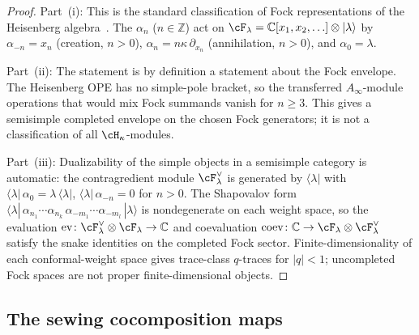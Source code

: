 \begin{proof}
Part~(i): This is the standard classification of Fock representations of
the Heisenberg algebra~\cite{FBZ04}. The $\alpha_n$ ($n \in \mathbb{Z}$)
act on $\cF_\lambda = \mathbb{C}[x_1, x_2, \ldots] \otimes
|\lambda\rangle$ by $\alpha_{-n} = x_n$ (creation, $n > 0$),
$\alpha_n = n\kappa\,\partial_{x_n}$ (annihilation, $n > 0$), and
$\alpha_0 = \lambda$.

Part~(ii): The statement is by definition a statement about the Fock
envelope. The Heisenberg OPE has no simple-pole bracket, so the
transferred $A_\infty$-module operations that would mix Fock summands
vanish for $n\ge3$. This gives a semisimple completed envelope on the
chosen Fock generators; it is not a classification of all
$\cH_\kappa$-modules.

Part~(iii): Dualizability of the simple objects in a semisimple
category is automatic: the contragredient module $\cF_\lambda^\vee$
is generated by $\langle\lambda|$ with $\langle\lambda|\,\alpha_0
= \lambda\,\langle\lambda|$, $\langle\lambda|\,\alpha_{-n} = 0$
for $n > 0$. The Shapovalov form
$\langle\lambda|\,\alpha_{n_1} \cdots \alpha_{n_k}\,
\alpha_{-m_1} \cdots \alpha_{-m_l}\,|\lambda\rangle$ is
nondegenerate on each weight space, so the evaluation
$\operatorname{ev}\colon \cF_\lambda^\vee \otimes \cF_\lambda
\to \mathbb{C}$ and coevaluation
$\operatorname{coev}\colon \mathbb{C} \to \cF_\lambda \otimes
\cF_\lambda^\vee$ satisfy the snake identities on the completed Fock
sector. Finite-dimensionality of each conformal-weight space gives
trace-class $q$-traces for $|q|<1$; uncompleted Fock spaces are not
proper finite-dimensional objects.
\end{proof}

\subsection{The sewing cocomposition maps}
\label{subsec:heisenberg-sewing-cocomposition}

